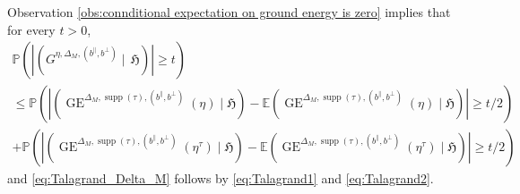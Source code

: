\documentclass[11pt, reqno]{amsart}
\newcommand{\E}{\mathbb{E}}
\DeclareMathOperator{\supp}{supp}
\DeclareMathOperator{\GE}{GE}
\renewcommand{\P}{\mathbb{P}}
\numberwithin{equation}{section}
\begin{document}
Observation \ref{obs:connditional expectation on ground energy is zero} implies that for every $t>0$,
\begin{multline*}
\P\left(\left\lvert\left(G^{\eta,\Delta_M,(b^{\parallel},b^{\perp})} \mid \, \mathfrak{H}\right)\right\rvert\geq t\right)\\
\leq \P\left(\left\lvert\left(\GE^{\Delta_M,\supp(\tau),(b^{\parallel},b^{\perp})}(\eta)\mid\mathfrak{H}\right)-\E \left(\GE^{\Delta_M,\supp(\tau),(b^{\parallel},b^{\perp})}(\eta) \mid \mathfrak{H}\right)\right\rvert \geq t/2 \right) \\
+\P\left(\left\lvert\left(\GE^{\Delta_M,\supp(\tau),(b^{\parallel},b^{\perp})}(\eta^{\tau})\mid\mathfrak{H}\right)-\E \left(\GE^{\Delta_M,\supp(\tau),(b^{\parallel},b^{\perp})}(\eta^{\tau}) \mid \mathfrak{H}\right)\right\rvert \geq t/2 \right) 
\end{multline*}
and \eqref{eq:Talagrand_Delta_M} follows by \eqref{eq:Talagrand1} and \eqref{eq:Talagrand2}.
\end{document}
